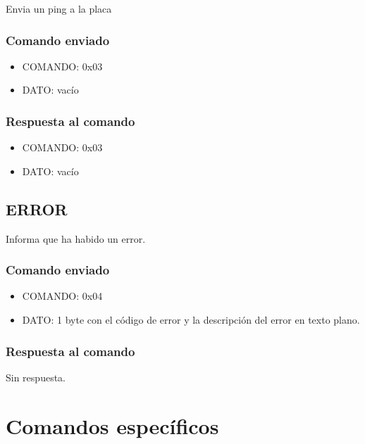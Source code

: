 \documentclass[a4paper,10pt]{article}
\begin{document}
Envia un ping a la placa

\subsubsection*{Comando enviado}
\label{ping_comando_enviado}

\begin{itemize}
	\item{COMANDO:} 0x03
	\item{DATO:} vac\'io
\end{itemize}

\subsubsection*{Respuesta al comando}
\label{ping_respuesta}

\begin{itemize}
	\item{COMANDO:} 0x03
	\item{DATO:} vac\'io
\end{itemize}

\subsection{ERROR}
\label{error}

Informa que ha habido un error.

\subsubsection*{Comando enviado}
\label{error_comando_enviado}

\begin{itemize}
	\item{COMANDO:} 0x04
	\item{DATO:} 1 byte con el c\'odigo de error y la descripci\'on del error en texto plano.
\end{itemize}

\subsubsection*{Respuesta al comando}
\label{error_respuesta}

Sin respuesta.

\section{Comandos espec\'ificos}
\label{comandos_especificos}
\end{document}

